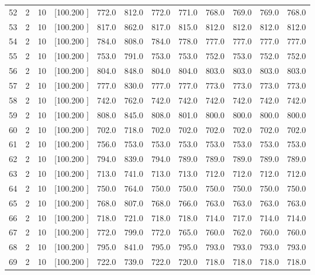 \documentclass[12pt,a4paper]{article}
\begin{document}
\begin{center}
{\begin{tabular}{r r r r r r r r r r r r}
  52&  2& 10&[100.200   ]&   772.0&   812.0&   772.0&   771.0&   768.0&   769.0&   769.0&   768.0\\[-0.02in]
  53&  2& 10&[100.200   ]&   817.0&   862.0&   817.0&   815.0&   812.0&   812.0&   812.0&   812.0\\[-0.02in]
  54&  2& 10&[100.200   ]&   784.0&   808.0&   784.0&   778.0&   777.0&   777.0&   777.0&   777.0\\[-0.02in]
  55&  2& 10&[100.200   ]&   753.0&   791.0&   753.0&   753.0&   752.0&   753.0&   752.0&   752.0\\[-0.02in]
  56&  2& 10&[100.200   ]&   804.0&   848.0&   804.0&   804.0&   803.0&   803.0&   803.0&   803.0\\[-0.02in]
  57&  2& 10&[100.200   ]&   777.0&   830.0&   777.0&   777.0&   773.0&   773.0&   773.0&   773.0\\[-0.02in]
  58&  2& 10&[100.200   ]&   742.0&   762.0&   742.0&   742.0&   742.0&   742.0&   742.0&   742.0\\[-0.02in]
  59&  2& 10&[100.200   ]&   808.0&   845.0&   808.0&   801.0&   800.0&   800.0&   800.0&   800.0\\[-0.02in]
  60&  2& 10&[100.200   ]&   702.0&   718.0&   702.0&   702.0&   702.0&   702.0&   702.0&   702.0\\[-0.02in]
  61&  2& 10&[100.200   ]&   756.0&   753.0&   753.0&   753.0&   753.0&   753.0&   753.0&   753.0\\[-0.02in]
  62&  2& 10&[100.200   ]&   794.0&   839.0&   794.0&   789.0&   789.0&   789.0&   789.0&   789.0\\[-0.02in]
  63&  2& 10&[100.200   ]&   713.0&   741.0&   713.0&   713.0&   712.0&   712.0&   712.0&   712.0\\[-0.02in]
  64&  2& 10&[100.200   ]&   750.0&   764.0&   750.0&   750.0&   750.0&   750.0&   750.0&   750.0\\[-0.02in]
  65&  2& 10&[100.200   ]&   768.0&   807.0&   768.0&   766.0&   763.0&   763.0&   763.0&   763.0\\[-0.02in]
  66&  2& 10&[100.200   ]&   718.0&   721.0&   718.0&   718.0&   714.0&   717.0&   714.0&   714.0\\[-0.02in]
  67&  2& 10&[100.200   ]&   772.0&   799.0&   772.0&   765.0&   760.0&   762.0&   760.0&   760.0\\[-0.02in]
  68&  2& 10&[100.200   ]&   795.0&   841.0&   795.0&   795.0&   793.0&   793.0&   793.0&   793.0\\[-0.02in]
  69&  2& 10&[100.200   ]&   722.0&   739.0&   722.0&   720.0&   718.0&   718.0&   718.0&   718.0\\[-0.02in]

\end{tabular}}
\end{center}
\end{document}
